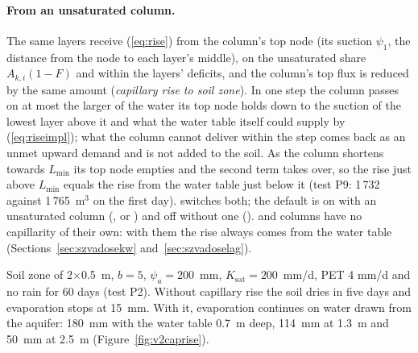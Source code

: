 \paragraph{From an unsaturated column.} The same layers receive (\ref{eq:rise}) from the column's top node (its suction
$\psi_1$, the distance from the node to each layer's middle), on the unsaturated share $A_{k,i}(1-F)$ and within the layers'
deficits, and the column's top flux is reduced by the same amount (\emph{capillary rise to soil zone}). In one step the
column passes on at most the larger of the water its top node holds down to the suction of the lowest layer above it
and what the water table itself could supply by (\ref{eq:riseimpl}); what the column cannot deliver within the step
comes back as an unmet upward demand and is not added to the soil. As the column shortens towards $L_{\min}$ its top
node empties and the second term takes over, so the rise just above $L_{\min}$ equals the rise from the water table
just below it (test P9: 1\,732 against 1\,765~m$^3$ on the first day).  switches both; the default is on with an unsaturated column
(,  or ) and off without one ().  and 
columns have no capillarity of their own: with them the rise always comes from the water table (Sections~\ref{sec:szvadosekw}
and~\ref{sec:szvadoselag}).

\begin{example}
Soil zone of 2$\times$0.5~m, $b=5$, $\psi_a=200$~mm, $K_{\mathrm{sat}}=200$~mm/d, PET 4 mm/d and no rain for 60 days
(test P2). Without capillary rise the soil dries in five days and evaporation stops at 15~mm. With it, evaporation
continues on water drawn from the aquifer: 180~mm with the water table 0.7~m deep, 114~mm at 1.3~m and 50~mm at 2.5~m
(Figure~\ref{fig:v2caprise}).
\end{example}



